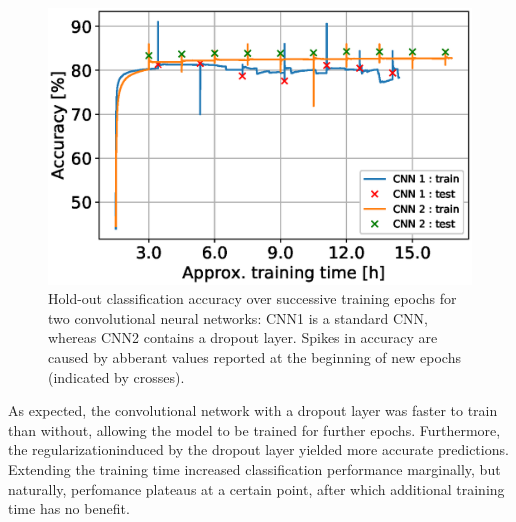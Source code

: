 \label{sec:results}
\begin{figure}[h!]
  \centering
  \includegraphics[scale=0.45]{CNNaccuracy}
  \caption{Hold-out classification accuracy over successive training epochs for two convolutional neural networks: CNN1 is a standard CNN, whereas CNN2 contains a dropout layer. Spikes in accuracy are caused by abberant values reported at the beginning of new epochs (indicated by crosses).}
  \label{plot:CNNaccuracy}
\end{figure}
\FloatBarrier

As expected, the convolutional network with a dropout layer was faster to train than without, allowing the model to be trained for further epochs. Furthermore, the regularizationinduced by the dropout layer yielded more accurate predictions. Extending the training time increased classification performance marginally, but naturally, perfomance plateaus at a certain point, after which additional training time has no benefit.
